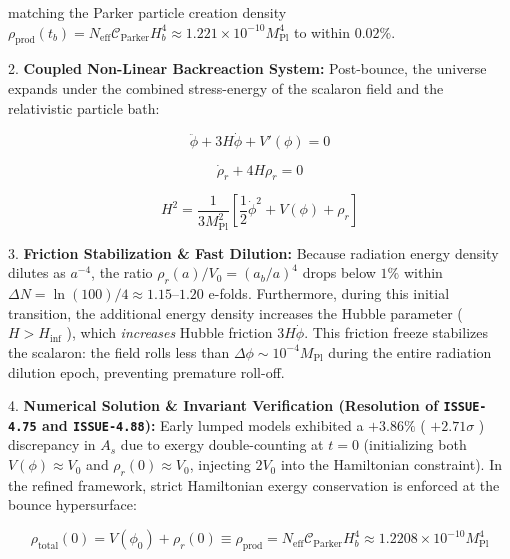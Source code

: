 \documentclass[11pt,a4paper]{article}
\theoremstyle{definition}\newtheorem{definition}{Definition}
\theoremstyle{remark}\newtheorem{remark}{Remark}
\begin{document}
matching the Parker particle creation density $\rho_{\text{prod}}(t_b) = N_{\text{eff}} \mathcal{C}_{\text{Parker}} H_b^4 \approx 1.221 \times 10^{-10} M_{\text{Pl}}^4$ to within $0.02\%$.

2. \textbf{Coupled Non-Linear Backreaction System:}
Post-bounce, the universe expands under the combined stress-energy of the scalaron field and the relativistic particle bath:


\begin{equation}
\ddot{\phi} + 3H\dot{\phi} + V'(\phi) = 0
\end{equation}



\begin{equation}
\dot{\rho}_r + 4H\rho_r = 0
\end{equation}



\begin{equation}
H^2 = \frac{1}{3 M_{\text{Pl}}^2} \left[ \frac{1}{2}\dot{\phi}^2 + V(\phi) + \rho_r \right]
\end{equation}


3. \textbf{Friction Stabilization \& Fast Dilution:}
Because radiation energy density dilutes as $a^{-4}$, the ratio $\rho_r(a) / V_0 = (a_b / a)^4$ drops below $1\%$ within $\Delta N = \ln(100)/4 \approx 1.15\text{--}1.20$ e-folds. Furthermore, during this initial transition, the additional energy density increases the Hubble parameter ( $H > H_{\text{inf}}$ ), which \textit{increases} Hubble friction $3H\dot{\phi}$. This friction freeze stabilizes the scalaron: the field rolls less than $\Delta\phi \sim 10^{-4} M_{\text{Pl}}$ during the entire radiation dilution epoch, preventing premature roll-off.

4. \textbf{Numerical Solution \& Invariant Verification (Resolution of \texttt{ISSUE-4.75} and \texttt{ISSUE-4.88}):}
Early lumped models exhibited a $+3.86\%$ ( $+2.71\sigma$ ) discrepancy in $A_s$ due to exergy double-counting at $t=0$ (initializing both $V(\phi) \approx V_0$ and $\rho_r(0) \approx V_0$, injecting $2V_0$ into the Hamiltonian constraint).
In the refined framework, strict Hamiltonian exergy conservation is enforced at the bounce hypersurface:


\begin{equation}
\rho_{\text{total}}(0) = V(\phi_0) + \rho_r(0) \equiv \rho_{\text{prod}} = N_{\text{eff}} \mathcal{C}_{\text{Parker}} H_b^4 \approx 1.2208 \times 10^{-10} M_{\text{Pl}}^4
\end{equation}
\end{document}
